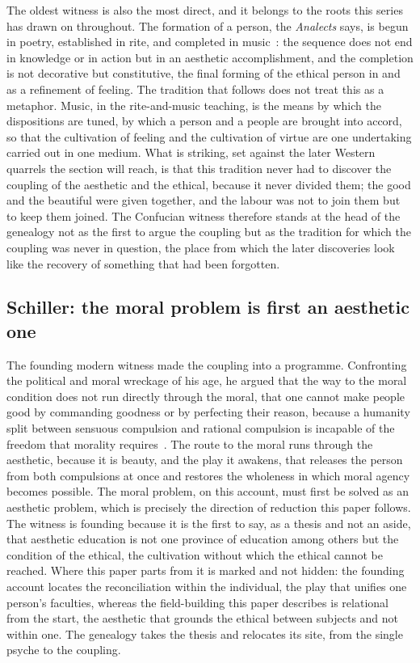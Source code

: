 The oldest witness is also the most direct, and it belongs to the roots this series has drawn on throughout. The formation of a person, the \textit{Analects} says, is begun in poetry, established in rite, and completed in music~\parencite{confucius_analects}: the sequence does not end in knowledge or in action but in an aesthetic accomplishment, and the completion is not decorative but constitutive, the final forming of the ethical person in and as a refinement of feeling. The tradition that follows does not treat this as a metaphor. Music, in the rite-and-music teaching, is the means by which the dispositions are tuned, by which a person and a people are brought into accord, so that the cultivation of feeling and the cultivation of virtue are one undertaking carried out in one medium. What is striking, set against the later Western quarrels the section will reach, is that this tradition never had to discover the coupling of the aesthetic and the ethical, because it never divided them; the good and the beautiful were given together, and the labour was not to join them but to keep them joined. The Confucian witness therefore stands at the head of the genealogy not as the first to argue the coupling but as the tradition for which the coupling was never in question, the place from which the later discoveries look like the recovery of something that had been forgotten.

\subsection{Schiller: the moral problem is first an aesthetic one}
\label{p22:sub:gen-schiller}

The founding modern witness made the coupling into a programme. Confronting the political and moral wreckage of his age, he argued that the way to the moral condition does not run directly through the moral, that one cannot make people good by commanding goodness or by perfecting their reason, because a humanity split between sensuous compulsion and rational compulsion is incapable of the freedom that morality requires~\parencite{schiller_aesthetic}. The route to the moral runs through the aesthetic, because it is beauty, and the play it awakens, that releases the person from both compulsions at once and restores the wholeness in which moral agency becomes possible. The moral problem, on this account, must first be solved as an aesthetic problem, which is precisely the direction of reduction this paper follows. The witness is founding because it is the first to say, as a thesis and not an aside, that aesthetic education is not one province of education among others but the condition of the ethical, the cultivation without which the ethical cannot be reached. Where this paper parts from it is marked and not hidden: the founding account locates the reconciliation within the individual, the play that unifies one person's faculties, whereas the field-building this paper describes is relational from the start, the aesthetic that grounds the ethical between subjects and not within one. The genealogy takes the thesis and relocates its site, from the single psyche to the coupling.

